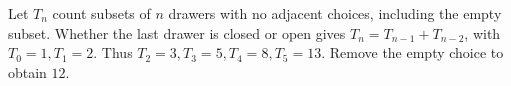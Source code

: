 Let $T_n$ count subsets of $n$ drawers with no adjacent choices, including the empty subset. Whether the last drawer is closed or open gives $T_n=T_{n-1}+T_{n-2}$, with $T_0=1,T_1=2$. Thus $T_2=3,T_3=5,T_4=8,T_5=13$. Remove the empty choice to obtain $\boxed{12}$.

